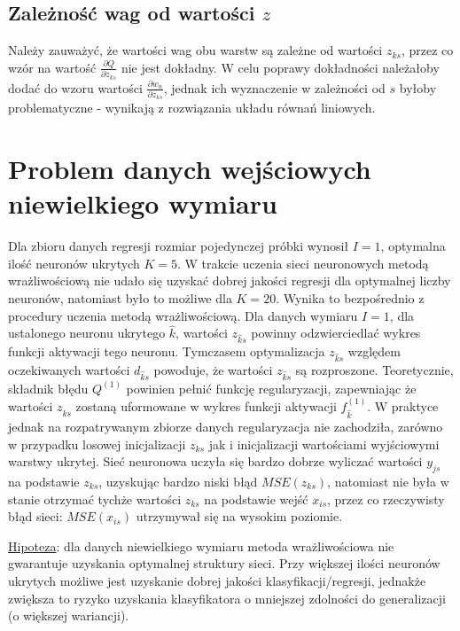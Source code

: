 \documentclass[11pt,a4paper]{article}
\begin{document}
\subsection{Zależność wag od wartości $z$}
Należy zauważyć, że wartości wag obu warstw są zależne od wartości $z_{ks}$, przez co wzór na wartość $\frac{\partial Q}{\partial z_{ks}}$ nie jest dokładny. W celu poprawy dokładności należałoby dodać do wzoru wartości $\frac{\partial w_n}{\partial z_{ks}}$, jednak ich wyznaczenie w zależności od $s$ byłoby problematyczne - wynikają z rozwiązania układu równań liniowych.

\section{Problem danych wejściowych niewielkiego wymiaru}
Dla zbioru danych regresji rozmiar pojedynczej próbki wynosił $I = 1$, optymalna ilość neuronów ukrytych $K = 5$. W trakcie uczenia sieci neuronowych metodą wrażliwościową nie udało się uzyskać dobrej jakości regresji dla optymalnej liczby neuronów, natomiast było to możliwe dla $K = 20$. Wynika to bezpośrednio z procedury uczenia metodą wrażliwościową. Dla danych wymiaru $I = 1$, dla ustalonego neuronu ukrytego $\hat{k}$, wartości $z_{\hat{k}s}$ powinny odzwierciedlać wykres funkcji aktywacji tego neuronu. Tymczasem optymalizacja $z_{\hat{k}s}$ względem oczekiwanych wartości $d_{\hat{k}s}$ powoduje, że wartości $z_{\hat{k}s}$ są rozproszone. Teoretycznie, składnik błędu $Q^{(1)}$ powinien pełnić funkcję regularyzacji, zapewniając że wartości $z_{\hat{k}s}$ zostaną uformowane w wykres funkcji aktywacji $f^{(1)}_{\hat{k}}$. W praktyce jednak na rozpatrywanym zbiorze danych regularyzacja nie zachodziła, zarówno w przypadku losowej inicjalizacji $z_{ks}$ jak i inicjalizacji wartościami wyjściowymi warstwy ukrytej. Sieć neuronowa uczyła się bardzo dobrze wyliczać wartości $y_{js}$ na podstawie $z_{ks}$, uzyskując bardzo niski błąd $MSE(z_{ks})$, natomiast nie była w stanie otrzymać tychże wartości $z_{ks}$ na podstawie wejść $x_{is}$, przez co rzeczywisty błąd sieci: $MSE(x_{is})$ utrzymywał się na wysokim poziomie.

\underline{Hipoteza}: dla danych niewielkiego wymiaru metoda wrażliwościowa nie gwarantuje uzyskania optymalnej struktury sieci. Przy większej ilości neuronów ukrytych możliwe jest uzyskanie dobrej jakości klasyfikacji/regresji, jednakże zwiększa to ryzyko uzyskania klasyfikatora o mniejszej zdolności do generalizacji (o większej wariancji).
\end{document}
